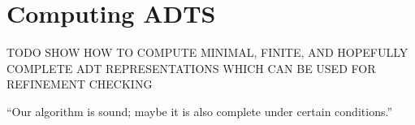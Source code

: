 \section{Computing ADTS}
\label{sec:computing}

TODO SHOW HOW TO COMPUTE MINIMAL, FINITE, AND HOPEFULLY COMPLETE ADT
REPRESENTATIONS WHICH CAN BE USED FOR REFINEMENT CHECKING

\begin{theorem}
  “Our algorithm is sound; maybe it is also complete under certain conditions.”
\end{theorem}
